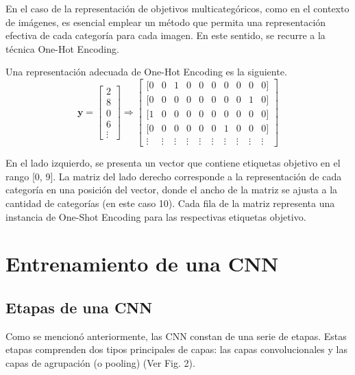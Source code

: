 \documentclass[journal]{IEEEtai}
\begin{document}
En el caso de la representación de objetivos multicategóricos, como en el contexto de imágenes, es esencial emplear un método que permita una representación efectiva de cada categoría para cada imagen. En este sentido, se recurre a la técnica One-Hot Encoding.

Una representación adecuada de One-Hot Encoding es la siguiente.
\setcounter{equation}{0}
\begin{equation}
\mathbf{y} =
\left[ \begin{array}{c} 2 \\ 8 \\ 0 \\ 6 \\ \vdots\end{array} \right]
\Longrightarrow
\begin{bmatrix}
  \textbf{[} 0 & 0 & 1 & 0 & 0 & 0 & 0 & 0 & 0 & 0 \textbf{]} \\
  \textbf{[} 0 & 0 & 0 & 0 & 0 & 0 & 0 & 0 & 1 & 0 \textbf{]} \\
  \textbf{[} 1 & 0 & 0 & 0 & 0 & 0 & 0 & 0 & 0 & 0 \textbf{]} \\
  \textbf{[} 0 & 0 & 0 & 0 & 0 & 0 & 1 & 0 & 0 & 0 \textbf{]} \\
  \vdots & \vdots & \vdots & \vdots & \vdots & \vdots & \vdots & \vdots & \vdots & \vdots
\end{bmatrix}
\end{equation}

En el lado izquierdo, se presenta un vector que contiene etiquetas objetivo en el rango [0, 9]. La matriz del lado derecho corresponde a la representación de cada categoría en una posición del vector, donde el ancho de la matriz se ajusta a la cantidad de categorías (en este caso 10). Cada fila de la matriz representa una instancia de One-Shot Encoding para las respectivas etiquetas objetivo.


\section{Entrenamiento de una CNN}

\subsection{Etapas de una CNN}

Como se mencionó anteriormente, las CNN constan de una serie de etapas. Estas etapas comprenden dos tipos principales de capas: las capas convolucionales y las capas de agrupación (o pooling) (Ver Fig. 2).
\end{document}

